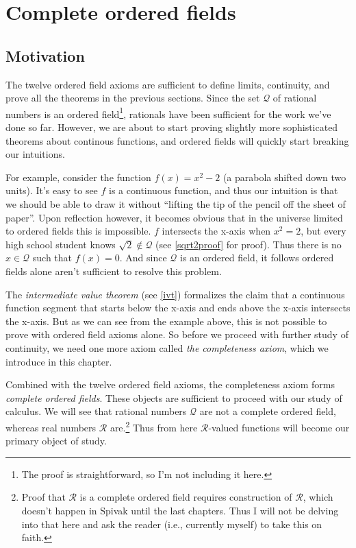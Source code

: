 \section{Complete ordered fields}


\subsection{Motivation}
The twelve ordered field axioms are sufficient to define limits,
continuity, and prove all the theorems in the previous sections. Since
the set $\mathcal{Q}$ of rational numbers is an ordered field\footnote{The proof
  is straightforward, so I'm not including it here.}, rationals have
been sufficient for the work we've done so far. However, we are about
to start proving slightly more sophisticated theorems about continous
functions, and ordered fields will quickly start breaking our
intuitions.

\vs

For example, consider the function $f(x)=x^{2}-2$ (a parabola shifted
down two units). It's easy to see $f$ is a continuous function, and
thus our intuition is that we should be able to draw it without
``lifting the tip of the pencil off the sheet of paper''. Upon
reflection however, it becomes obvious that in the universe limited to
ordered fields this is impossible. $f$ intersects the x-axis when
$x^{2}=2$, but every high school student knows
$\sqrt{2}\notin\mathcal{Q}$ (see \ref{sqrt2proof} for proof). Thus there is no
$x\in\mathcal{Q}$ such that $f(x)=0$. And since $\mathcal{Q}$ is an ordered field, it
follows ordered fields alone aren't sufficient to resolve this
problem.

\vs

The \textit{intermediate value theorem} (see \ref{ivt}) formalizes the
claim that a continuous function segment that starts below the x-axis
and ends above the x-axis intersects the x-axis. But as we can see
from the example above, this is not possible to prove with ordered
field axioms alone. So before we proceed with further study of
continuity, we need one more axiom called \textit{the completeness
  axiom}, which we introduce in this chapter.

\vs

Combined with the twelve ordered field axioms, the completeness axiom
forms \textit{complete ordered fields}. These objects are sufficient
to proceed with our study of calculus. We will see that rational
numbers $\mathcal{Q}$ are not a complete ordered field, whereas real numbers
$\mathcal{R}$ are.\footnote{Proof that $\mathcal{R}$ is a complete ordered field requires
  construction of $\mathcal{R}$, which doesn't happen in Spivak until the last
  chapters. Thus I will not be delving into that here and ask the
  reader (i.e., currently myself) to take this on faith.} Thus from
here $\mathcal{R}$-valued functions will become our primary object of study.


